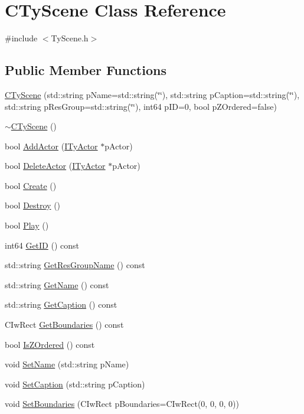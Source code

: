\hypertarget{class_c_ty_scene}{
\section{CTyScene Class Reference}
\label{class_c_ty_scene}
}


{\ttfamily \#include $<$TyScene.h$>$}

\subsection*{Public Member Functions}
\begin{DoxyCompactItemize}
\item 
\hyperlink{class_c_ty_scene_ac3ffa8af3df717e521b41f714e8bdfeb}{CTyScene} (std::string pName=std::string(\char`\"{}\char`\"{}), std::string pCaption=std::string(\char`\"{}\char`\"{}), std::string pResGroup=std::string(\char`\"{}\char`\"{}), int64 pID=0, bool pZOrdered=false)
\item 
\hyperlink{class_c_ty_scene_a18020d4f345af48e4c321edc38495149}{$\sim$CTyScene} ()
\item 
bool \hyperlink{class_c_ty_scene_a9687222ea13378c58e055f97b4037e00}{AddActor} (\hyperlink{class_i_ty_actor}{ITyActor} $\ast$pActor)
\item 
bool \hyperlink{class_c_ty_scene_a85d44ded276f4209bade96297590c435}{DeleteActor} (\hyperlink{class_i_ty_actor}{ITyActor} $\ast$pActor)
\item 
bool \hyperlink{class_c_ty_scene_af9f4043d72a92cbd4ecb51dc9c13d3fa}{Create} ()
\item 
bool \hyperlink{class_c_ty_scene_ad93f23349d95555895d404d5c23430bb}{Destroy} ()
\item 
bool \hyperlink{class_c_ty_scene_aeb00a9b2f06dda4e1320bcc425f64f41}{Play} ()
\item 
int64 \hyperlink{class_c_ty_scene_a7bcb97321dd9146f0943b9e6f6812557}{GetID} () const 
\item 
std::string \hyperlink{class_c_ty_scene_a693e6a9c375ad62952d7c0d522699a06}{GetResGroupName} () const 
\item 
std::string \hyperlink{class_c_ty_scene_a101d35e3d07a8491761dcb25dc07d5dd}{GetName} () const 
\item 
std::string \hyperlink{class_c_ty_scene_ac4efdea36741e607325740ffeb3b059d}{GetCaption} () const 
\item 
CIwRect \hyperlink{class_c_ty_scene_aa8640d7a7e4b8a5719bd028c5de8b608}{GetBoundaries} () const 
\item 
bool \hyperlink{class_c_ty_scene_a7493b6326072830c8dad9c40f6e5573f}{IsZOrdered} () const 
\item 
void \hyperlink{class_c_ty_scene_a2475029f0e2944660057388ef9321d33}{SetName} (std::string pName)
\item 
void \hyperlink{class_c_ty_scene_aa8e00f437e9dbcb87cb90f3a5fcb6138}{SetCaption} (std::string pCaption)
\item 
void \hyperlink{class_c_ty_scene_a109099231d27f9f28aa4b73b328397cb}{SetBoundaries} (CIwRect pBoundaries=CIwRect(0, 0, 0, 0))
\end{DoxyCompactItemize}
